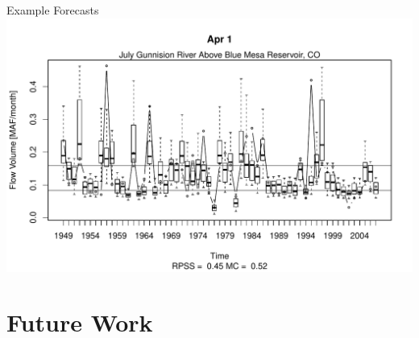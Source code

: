 \documentclass{beamer}
\begin{document}
\begin{frame}{Example Forecasts}
\includegraphics[width=\textwidth]{figs/Apr1_July_Gunnision_River_Above_Blue_Mesa_Reservoir,_CO_all_box.pdf}
\end{frame}

\section{Future Work}
\end{document}
